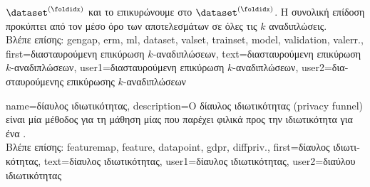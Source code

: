{{{		$\dataset^{(\foldidx)}$ και το επικυρώνουμε στο $\dataset^{(\foldidx)}$. 
		Η συνολική επίδοση προκύπτει από τον μέσο όρο των αποτελεσμάτων} 
		 \foreignlanguage{greek}{σε όλες τις $k$ αναδιπλώσεις}.
		\\
		\foreignlanguage{greek}{Βλέπε επίσης:} \gls{gengap}, \gls{erm}, \gls{ml}, \gls{dataset}, \gls{valset}, \gls{trainset}, \gls{model}, 
		\gls{validation}, \gls{valerr}.},
	first={\foreignlanguage{greek}{διασταυρούμενη επικύρωση $k$-αναδιπλώσεων}},
	text={\foreignlanguage{greek}{διασταυρούμενη επικύρωση $k$-αναδιπλώσεων}}, 
	user1={\foreignlanguage{greek}{διασταυρούμενη επικύρωση $k$-αναδιπλώσεων}}, %
	user2={\foreignlanguage{greek}{διασταυρούμενης επικύρωσης $k$-αναδιπλώσεων}} %
}

{name={\foreignlanguage{greek}{δίαυλος ιδιωτικότητας}},
 	description={\foreignlanguage{greek}{Ο δίαυλος ιδιωτικότητας} 
		(privacy funnel) \foreignlanguage{greek}{είναι μία μέθοδος για τη μάθηση μίας}  
		\foreignlanguage{greek}{που παρέχει φιλικά προς την ιδιωτικότητα}  \foreignlanguage{greek}{για 
		ένα}  \cite{PrivacyFunnel}.
		\\
		\foreignlanguage{greek}{Βλέπε επίσης:} \gls{featuremap}, \gls{feature}, \gls{datapoint}, \gls{gdpr}, \gls{diffpriv}.},
 	first={\foreignlanguage{greek}{δίαυλος ιδιωτικότητας}},
 	text={\foreignlanguage{greek}{δίαυλος ιδιωτικότητας}},
 	user1={\foreignlanguage{greek}{δίαυλος ιδιωτικότητας}}, %
 	user2={\foreignlanguage{greek}{διαύλου ιδιωτικότητας}} %
}

